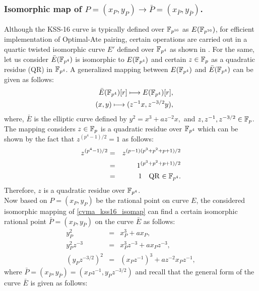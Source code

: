 \subsubsection{Isomorphic map of  \texorpdfstring{$P=(x_P,y_P) \to \bar P=(x_{\bar P},y_{\bar P})$}{}.}
Although the KSS-16 curve is typically defined over $\mathbb{F}_{p^{16}}$ as $E(\mathbb{F}_{p^{16}})$, for efficient implementation of Optimal-Ate pairing, certain operations are carried out in a quartic twisted isomorphic curve $E'$ defined over $\mathbb{F}_{p^4}$ as shown in  . 
For the same, let us consider $\bar{E}(\mathbb{F}_{p^4})$ is isomorphic to $E(\mathbb{F}_{p^4})$ and certain $z \in {\mathbb{F}}_{p}$ as a quadratic residue (QR) in $\mathbb{F}_{p^4}$. 
A generalized mapping between $E(\mathbb{F}_{p^4})$ and $\bar{E}(\mathbb{F}_{p^4})$ can be given as follows:
\begin{eqnarray}
&&\bar{E}(\mathbb{F}_{p^4})[r]\longmapsto E(\mathbb{F}_{p^4})[r],\nonumber\\
&&(x,y)\longmapsto (z^{-1}x,z^{-3/2}y),\label{cvma_kss16_isomap}\nonumber
\end{eqnarray}
where,  $\bar{E}$ is the elliptic curve defined by  $ y^2=x^3+az^{-2}x,$ and $z, z^{-1},z^{-3/2}\in {\mathbb{F}}_{p}$.\\
The mapping considers $z \in {\mathbb{F}}_{p}$ is a quadratic residue over $\mathbb{F}_{p^4}$ which can be shown by the fact that $z^{(p^4-1)/2} = 1$ as follows:
\begin{eqnarray}
z^{(p^4-1)/2}& = &z^{(p-1)(p^3+p^2+p+1)/2 } \nonumber \\
& = &1^{(p^3+p^2+p+1)/2 } \nonumber \\
& = & 1 \quad \text{QR $\in \mathbb{F}_{p^4}$}.
\end{eqnarray}
Therefore, $z$ is a quadratic residue over $\mathbb{F}_{p^4}$.\\
Now  based on $P= (x_P, y_P)$ be the rational point on curve $E$, the considered isomorphic mapping of \eqref{cvma_kss16_isomap}  can find a certain isomorphic rational point $\bar P = (x_{\bar P}, y_{\bar P})$ on the curve $\bar E$ as follows:
\begin{eqnarray}\label{eq:cvma_kss16_bar_P}
y_P^2 & = & x_P^3+ax_P, \nonumber \\
y_P^2 z^{-3}& = & x_P^3 z^{-3} +ax_Pz^{-3}, \nonumber \\
(y_P z^{-3/2})^2& = & (x_Pz^{-1})^3 +az^{-2} x_Pz^{-1},
\end{eqnarray}
where $\bar P = (x_{\bar P}, y_{\bar P}) = (x_P z^{-1},y_P z^{-3/2})$ and recall that the general form of the curve $\bar E$ is given as follows:
